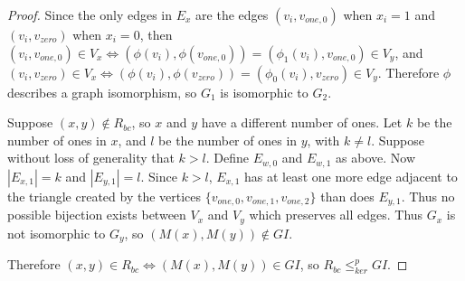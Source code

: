 \documentclass{article}
\theoremstyle{definition}
\newcommand{\kr}{\leq^{p}_{ker}} %
\begin{document}
\begin{proof}
  Since the only edges in $E_x$ are the edges $(v_i, v_{one,0})$ when $x_i=1$
  and $(v_i, v_{zero})$ when $x_i=0$, then $(v_i, v_{one,0})\in V_x
  \iff (\phi(v_i), \phi(v_{one,0}))=(\phi_1(v_i), v_{one,0})\in
  V_y$, and $(v_i, v_{zero})\in V_x \iff (\phi(v_i), \phi(v_{zero}))
  = (\phi_0(v_i), v_{zero})\in V_y$. Therefore $\phi$ describes a graph
  isomorphism, so $G_1$ is isomorphic to $G_2$.
  
  Suppose $(x, y)\notin R_{bc}$, so $x$ and $y$ have a different number of
  ones. Let $k$ be the number of ones in $x$, and $l$ be the number of ones in
  $y$, with $k\neq l$. Suppose without loss of generality that $k>l$. Define
  $E_{w,0}$ and $E_{w,1}$ as above. Now $|E_{x,1}|=k$ and $|E_{y,1}|=l$. Since
  $k>l$, $E_{x,1}$ has at least one more edge adjacent to the triangle created
  by the vertices $\{v_{one,0},v_{one,1},v_{one,2}\}$ than does $E_{y,1}$. Thus
  no possible bijection exists between $V_x$ and $V_y$ which preserves all
  edges. Thus $G_x$ is not isomorphic to $G_y$, so $(M(x), M(y))\notin GI$.

  Therefore $(x, y)\in R_{bc} \iff (M(x), M(y))\in GI$, so $R_{bc}\kr GI$.
\end{proof}
\end{document}
